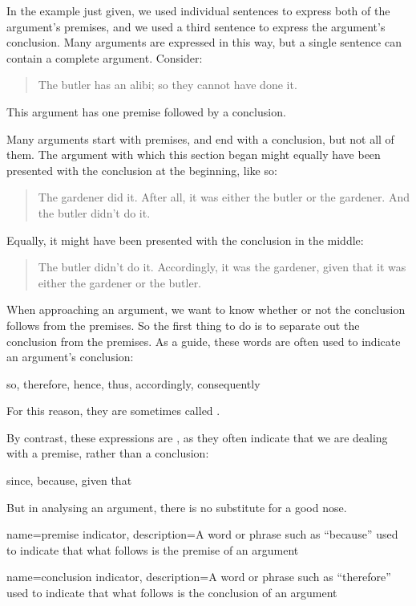 In the example just given, we used individual sentences to express both of the argument's premises, and we used a third sentence to express the argument's conclusion. Many arguments are expressed in this way, but a single sentence can contain a complete argument. Consider:
	\begin{quote}
		 The butler has an alibi; so they cannot have done it.
	\end{quote}
This argument has one premise followed by a conclusion.

Many arguments start with premises, and end with a conclusion, but not all of them. The argument with which this section began might equally have been presented with the conclusion at the beginning, like so:
	\begin{quote}
		The gardener did it. After all, it was either the butler or the
		gardener. And the butler didn't do it.
	\end{quote}
Equally, it might have been presented with the conclusion in the middle:
	\begin{quote}
		The butler didn't do it. Accordingly, it was the gardener,
		given that it was either the gardener or the butler.
	\end{quote}
When approaching an argument, we want to know whether or not the conclusion follows from the premises. So the first thing to do is to separate out the conclusion from the premises. As a guide, these words are often used to indicate an argument's conclusion:
	\begin{center}
		so, therefore, hence, thus, accordingly, consequently
	\end{center}
For this reason, they are sometimes called .

By contrast, these expressions are ,
as they often indicate that we are dealing with a premise, rather than a
conclusion:
	\begin{center}
		since, because, given that
	\end{center}
But in analysing an argument, there is no substitute for a good nose.

{
name=premise indicator,
description={A word or phrase such as ``because'' used to indicate that what follows is the premise of an argument}
}

{
name=conclusion indicator,
description={A word or phrase such as ``therefore'' used to indicate that what follows is the conclusion of an argument}
}

